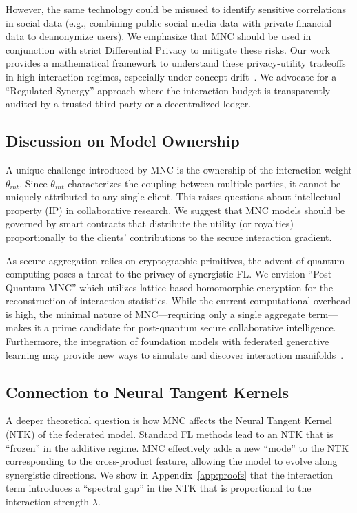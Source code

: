 \documentclass{article}
\theoremstyle{plain}
\theoremstyle{definition}
\begin{document}
However, the same technology could be misused to identify sensitive correlations in social data (e.g., combining public social media data with private financial data to deanonymize users). We emphasize that MNC should be used in conjunction with strict Differential Privacy to mitigate these risks. Our work provides a mathematical framework to understand these privacy-utility tradeoffs in high-interaction regimes, especially under concept drift~\cite{fu2025conceptdrift}. We advocate for a ``Regulated Synergy'' approach where the interaction budget is transparently audited by a trusted third party or a decentralized ledger.

\subsection{Discussion on Model Ownership}
A unique challenge introduced by MNC is the ownership of the interaction weight $\theta_{int}$. Since $\theta_{int}$ characterizes the coupling between multiple parties, it cannot be uniquely attributed to any single client. This raises questions about intellectual property (IP) in collaborative research. We suggest that MNC models should be governed by smart contracts that distribute the utility (or royalties) proportionally to the clients' contributions to the secure interaction gradient.

As secure aggregation relies on cryptographic primitives, the advent of quantum computing poses a threat to the privacy of synergistic FL. We envision ``Post-Quantum MNC'' which utilizes lattice-based homomorphic encryption for the reconstruction of interaction statistics. While the current computational overhead is high, the minimal nature of MNC—requiring only a single aggregate term—makes it a prime candidate for post-quantum secure collaborative intelligence. Furthermore, the integration of foundation models with federated generative learning may provide new ways to simulate and discover interaction manifolds~\cite{zhang2024generative,wang2024llm_fl}.

\subsection{Connection to Neural Tangent Kernels}
A deeper theoretical question is how MNC affects the Neural Tangent Kernel (NTK) of the federated model. Standard FL methods lead to an NTK that is ``frozen'' in the additive regime. MNC effectively adds a new ``mode'' to the NTK corresponding to the cross-product feature, allowing the model to evolve along synergistic directions. We show in Appendix~\ref{app:proofs} that the interaction term introduces a ``spectral gap'' in the NTK that is proportional to the interaction strength $\lambda$.
\end{document}
